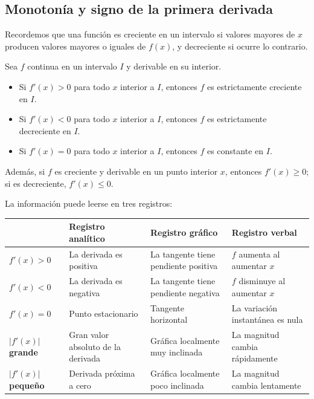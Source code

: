 \subsection{Monotonía y signo de la primera derivada}

Recordemos que una función es creciente en un intervalo si valores mayores de $x$ producen valores mayores o iguales de $f(x)$, y decreciente si ocurre lo contrario.

\begin{theorem}
Sea $f$ continua en un intervalo $I$ y derivable en su interior.
\begin{itemize}
\item Si $f'(x)>0$ para todo $x$ interior a $I$, entonces $f$ es estrictamente creciente en $I$.
\item Si $f'(x)<0$ para todo $x$ interior a $I$, entonces $f$ es estrictamente decreciente en $I$.
\item Si $f'(x)=0$ para todo $x$ interior a $I$, entonces $f$ es constante en $I$.
\end{itemize}
Además, si $f$ es creciente y derivable en un punto interior $x$, entonces $f'(x)\geq0$; si es decreciente, $f'(x)\leq0$.
\end{theorem}

La información puede leerse en tres registros:

\begin{center}
\renewcommand{\arraystretch}{1.45}
\begin{tabularx}{\textwidth}{@{}>{\bfseries}lXXX@{}}
\toprule
 & Registro analítico & Registro gráfico & Registro verbal \\
\midrule
$f'(x)>0$ & La derivada es positiva & La tangente tiene pendiente positiva & $f$ aumenta al aumentar $x$ \\
$f'(x)<0$ & La derivada es negativa & La tangente tiene pendiente negativa & $f$ disminuye al aumentar $x$ \\
$f'(x)=0$ & Punto estacionario & Tangente horizontal & La variación instantánea es nula \\
$|f'(x)|$ grande & Gran valor absoluto de la derivada & Gráfica localmente muy inclinada & La magnitud cambia rápidamente \\
$|f'(x)|$ pequeño & Derivada próxima a cero & Gráfica localmente poco inclinada & La magnitud cambia lentamente \\
\bottomrule
\end{tabularx}
\end{center}


